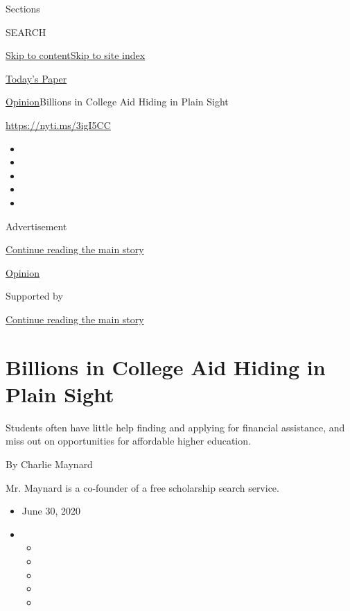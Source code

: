 Sections

SEARCH

\protect\hyperlink{site-content}{Skip to
content}\protect\hyperlink{site-index}{Skip to site index}

\href{https://myaccount.nytimes.com/auth/login?response_type=cookie\&client_id=vi}{}

\href{https://www.nytimes.com/section/todayspaper}{Today's Paper}

\href{/section/opinion}{Opinion}\textbar{}Billions in College Aid Hiding
in Plain Sight

\href{https://nyti.ms/3igI5CC}{https://nyti.ms/3igI5CC}

\begin{itemize}
\item
\item
\item
\item
\item
\end{itemize}

Advertisement

\protect\hyperlink{after-top}{Continue reading the main story}

\href{/section/opinion}{Opinion}

Supported by

\protect\hyperlink{after-sponsor}{Continue reading the main story}

\hypertarget{billions-in-college-aid-hiding-in-plain-sight}{%
\section{Billions in College Aid Hiding in Plain
Sight}\label{billions-in-college-aid-hiding-in-plain-sight}}

Students often have little help finding and applying for financial
assistance, and miss out on opportunities for affordable higher
education.

By Charlie Maynard

Mr. Maynard is a co-founder of a free scholarship search service.

\begin{itemize}
\item
  June 30, 2020
\item
  \begin{itemize}
  \item
  \item
  \item
  \item
  \item
  \end{itemize}
\end{itemize}


